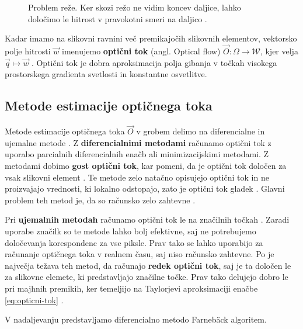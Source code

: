 \begin{figure}[htb]
\centering

\caption[Problem reže]{Problem reže. Ker skozi režo ne vidim koncev daljice, lahko določimo le hitrost v pravokotni smeri na daljico \cite{trucco1998introductory}.}
\label{fig:aperture-problem}
\end{figure}




Kadar imamo na slikovni ravnini več premikajočih slikovnih elementov, vektorsko polje hitrosti $\vec{w}$ imenujemo \textbf{optični tok} (angl. Optical flow) $\vec{O}: \mathit{\Omega} \to \mathcal{W}$, kjer velja $ \vec{q} \mapsto \vec{w}$ \cite{trucco1998introductory}. Optični tok je dobra aproksimacija polja gibanja v točkah visokega prostorskega gradienta svetlosti in konstantne osvetlitve.



\subsection{Metode estimacije optičnega toka}\label{sec:metode-of}

Metode estimacije optičnega toka $\vec{O}$ v grobem delimo na diferencialne in {ujemalne} metode \cite{trucco1998introductory}. Z \textbf{diferencialnimi metodami} računamo optični tok z uporabo parcialnih diferencialnih enačb ali minimizacijskimi metodami. Z metodami dobimo \textbf{gost optični tok}, kar pomeni, da je optični tok določen za vsak slikovni element \cite{trucco1998introductory}. Te metode zelo natačno opisujejo optični tok in ne proizvajajo vrednosti, ki lokalno odstopajo, zato je optični tok gladek \cite{brox2011large}.  Glavni problem teh metod je, da so računsko zelo zahtevne \cite{trucco1998introductory}.

Pri \textbf{ujemalnih metodah} računamo optični tok le na značilnih točkah \cite{trucco1998introductory}. Zaradi uporabe značilk so te metode lahko bolj efektivne, saj ne potrebujemo določevanja korespondenc za vse piksle. Prav tako se lahko uporabijo za računanje optičnega toka v realnem času, saj niso računsko zahtevne. Po \cite{trucco1998introductory} je največja težava teh metod, da računajo \textbf{redek optični tok}, saj je ta določen le za slikovne elemete, ki predstavljajo značilne točke. Prav tako delujejo dobro le pri majhnih premikih, ker temeljijo na Taylorjevi aproksimaciji enačbe \eqref{eq:opticni-tok} \cite{wedel2011stereo}. 

V nadaljevanju predstavljamo diferencialno metodo Farneb{\"a}ck algoritem.

